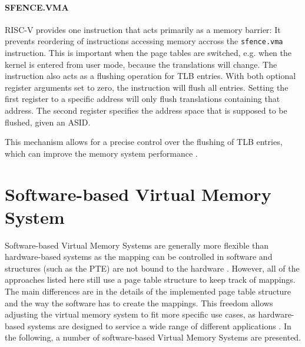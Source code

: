 \paragraph{SFENCE.VMA} RISC-V provides one instruction that acts primarily as a memory barrier:
It prevents reordering of instructions accessing memory accross the \texttt{sfence.vma} instruction.
This is important when the page tables are switched, e.g. when the kernel is entered from user mode,
because the translations will change.
The instruction also acts as a flushing operation for TLB entries. With both optional register
arguments set to zero, the instruction will flush all entries.
Setting the first register to a specific address will only flush translations containing that address.
The second register specifies the address space that is supposed to be flushed, given an ASID.

This mechanism allows for a precise control over the flushing of TLB entries, which can improve the
memory system performance \cite{RISCVInstructionSet}.










\section{Software-based Virtual Memory System}

Software-based Virtual Memory Systems are generally more flexible than hardware-based systems
as the mapping can be controlled in software and structures (such as the PTE) are not bound
to the hardware \cite{jacob1998virtualissues}.
However, all of the approaches listed here still use a page table structure to keep track of mappings.
The main differences are in the details of the implemented page table structure and the way the software has to create the mappings. This freedom allows adjusting the virtual memory system to fit more specific use cases, as hardware-based systems are designed to service a wide range of different applications \cite{jacob1998look}.
In the following, a number of software-based Virtual Memory Systems are presented.
